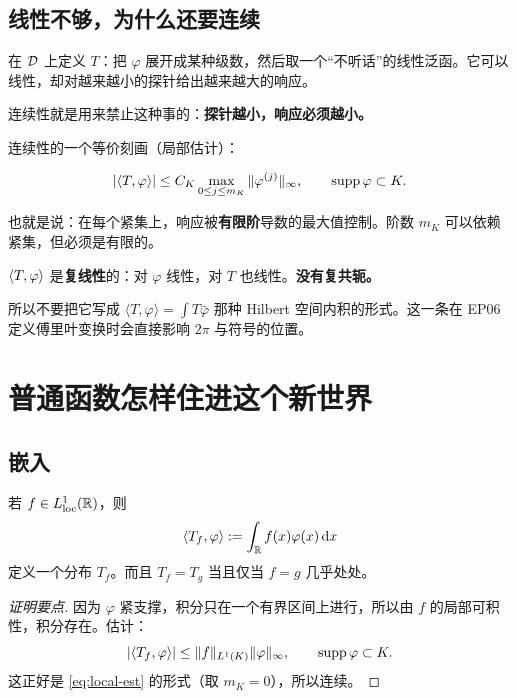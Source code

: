 \subsection{线性不够，为什么还要连续}

\begin{ideabox}
在 $\mathcal{D}$ 上定义 $T$：把 $\varphi$ 展开成某种级数，然后取一个“不听话”的线性泛函。它可以线性，却对越来越小的探针给出越来越大的响应。

连续性就是用来禁止这种事的：\textbf{探针越小，响应必须越小。}
\end{ideabox}

连续性的一个等价刻画（局部估计）：

\begin{equation}
|\langle T,\varphi\rangle|\le C_K\max_{0\le j\le m_K}\|\varphi^{(j)}\|_\infty,
\qquad \operatorname{supp}\varphi\subset K .\label{eq:local-est}
\end{equation}

也就是说：在每个紧集上，响应被\textbf{有限阶}导数的最大值控制。阶数 $m_K$ 可以依赖紧集，但必须是有限的。

\begin{notebox}[配对不是内积]
$\langle T,\varphi\rangle$ 是\textbf{复线性}的：对 $\varphi$ 线性，对 $T$ 也线性。\textbf{没有复共轭。}

所以不要把它写成 $\langle T,\varphi\rangle=\int T\bar\varphi$ 那种 Hilbert 空间内积的形式。这一条在 EP06 定义傅里叶变换时会直接影响 $2\pi$ 与符号的位置。
\end{notebox}

\section{普通函数怎样住进这个新世界}

\subsection{嵌入}

\begin{prop}\label{prop:embed}
若 $f\in L^1_{\mathrm{loc}}(\mathbb{R})$，则
\begin{equation}
\langle T_f,\varphi\rangle:=\int_{\mathbb{R}}f(x)\varphi(x)\mathop{}\!\mathrm{d} x
\end{equation}
定义一个分布 $T_f$。而且 $T_f=T_g$ 当且仅当 $f=g$ 几乎处处。
\end{prop}

\begin{proof}[证明要点]
因为 $\varphi$ 紧支撑，积分只在一个有界区间上进行，所以由 $f$ 的局部可积性，积分存在。估计：
\begin{equation}
|\langle T_f,\varphi\rangle|\le\|f\|_{L^{1}(K)}\|\varphi\|_\infty,
\qquad \operatorname{supp}\varphi\subset K .
\end{equation}
这正好是 \eqref{eq:local-est} 的形式（取 $m_K=0$），所以连续。
\end{proof}

